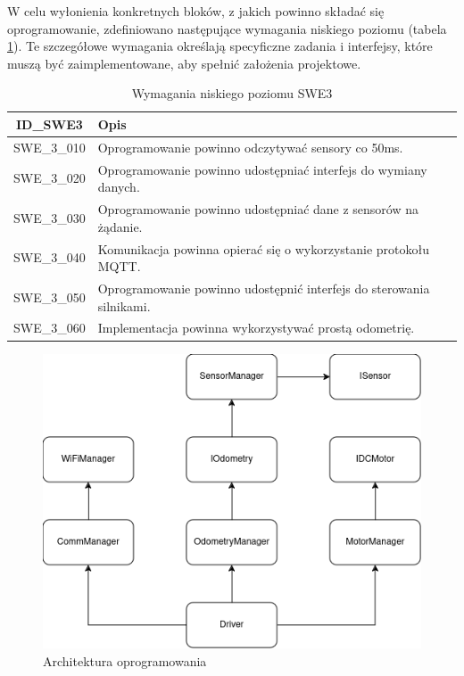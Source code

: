 \documentclass[12pt,twoside]{article}
\begin{document}
W celu wyłonienia konkretnych bloków, z jakich powinno składać się oprogramowanie, zdefiniowano następujące wymagania niskiego poziomu (tabela \ref{Tab:SWE3}). Te szczegółowe wymagania określają specyficzne zadania i interfejsy, które muszą być zaimplementowane, aby spełnić założenia projektowe.

\begin{table}[ht]
\caption{Wymagania niskiego poziomu SWE3}
\centering		
	\begin{tabular}{|c|p{}|}	
		\hline
		ID\_SWE3 & Opis \\
		\hline
		SWE\_3\_010 & Oprogramowanie powinno odczytywać sensory co 50ms. \\
		\hline
		SWE\_3\_020 & Oprogramowanie powinno udostępniać interfejs do wymiany danych. \\
		\hline 
		SWE\_3\_030 & Oprogramowanie powinno udostępniać dane z sensorów na żądanie.\\
		\hline
		SWE\_3\_040 & Komunikacja powinna opierać się o wykorzystanie protokołu MQTT. \\
		\hline
		SWE\_3\_050 & Oprogramowanie powinno udostępnić interfejs do sterowania silnikami. \\
		\hline
		SWE\_3\_060 & Implementacja powinna wykorzystywać prostą odometrię. \\
				\hline
	\end{tabular}	
	
\label{Tab:SWE3}
\end{table}	

\newpage

\begin{figure}[ht]%
 \centering%
 \includegraphics[width=12cm]{figures/engSW/block.png}%
 \caption{Architektura oprogramowania}%
 \label{Fig:architektura}%
\end{figure}
\end{document}
